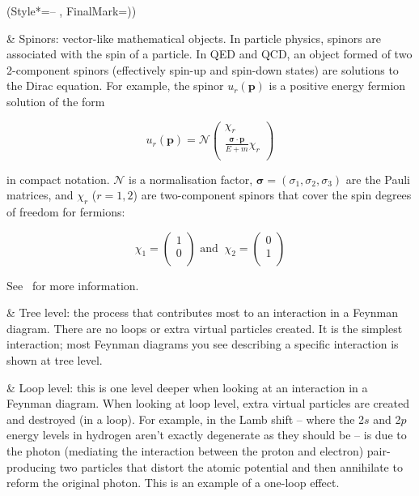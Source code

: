 \begin{easylist}[itemize]
\ListProperties(Style*=-- , FinalMark={)})

& Spinors: vector-like mathematical objects. In particle physics, spinors are associated with the spin of a particle. In QED and QCD, an object formed of two 2-component spinors (effectively spin-up and spin-down states) are solutions to the Dirac equation. For example, the spinor $u_r (\mathbf{p})$ is a positive energy fermion solution of the form

\begin{equation}
u_r (\mathbf{p}) = \mathcal{N}
\begin{pmatrix}
\chi_r \\
\frac{ \boldsymbol{\sigma} \cdot \mathbf{p} }{ E + m } \chi_r \\
\end{pmatrix}
\end{equation}

in compact notation. $\mathcal{N}$ is a normalisation factor, $\boldsymbol{\sigma} = (\sigma_1, \sigma_2, \sigma_3)$ are the Pauli matrices, and $\chi_r$ ($r = 1, 2$) are two-component spinors that cover the spin degrees of freedom for fermions:

\begin{equation}
\chi_1 = 
\begin{pmatrix}
1 \\
0 \\
\end{pmatrix}
\textrm{ and } \ 
\chi_2 = 
\begin{pmatrix}
0 \\
1 \\
\end{pmatrix}
\end{equation}

See~\cite{Steane:2013wra} for more information.

& Tree level: the process that contributes most to an interaction in a Feynman diagram. There are no loops or extra virtual particles created. It is the simplest interaction; most Feynman diagrams you see describing a specific interaction is shown at tree level.

& Loop level: this is one level deeper when looking at an interaction in a Feynman diagram. When looking at loop level, extra virtual particles are created and destroyed (in a loop). For example, in the Lamb shift -- where the 2$s$ and 2$p$ energy levels in hydrogen aren't exactly degenerate as they should be -- is due to the photon (mediating the interaction between the proton and electron) pair-producing two particles that distort the atomic potential and then annihilate to reform the original photon. This is an example of a one-loop effect.


\end{easylist}
